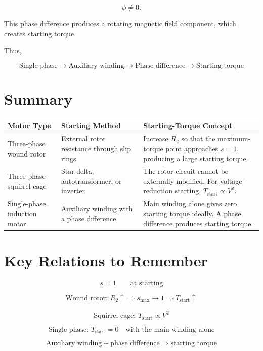 \documentclass[a4paper,11pt]{article}
\begin{document}
\[
\phi \neq 0.
\]

This phase difference produces a rotating magnetic field component,
which creates starting torque.

Thus,

\[
\boxed{
\text{Single phase}
\rightarrow
\text{Auxiliary winding}
\rightarrow
\text{Phase difference}
\rightarrow
\text{Starting torque}
}
\]

\section{Summary}

\begin{center}
\renewcommand{\arraystretch}{1.5}
\begin{tabular}{p{} p{} p{}}
\toprule
\textbf{Motor Type} &
\textbf{Starting Method} &
\textbf{Starting-Torque Concept} \\
\midrule

Three-phase wound rotor &
External rotor resistance through slip rings &
Increase \(R_2\) so that the maximum-torque point approaches
\(s=1\), producing a large starting torque. \\

Three-phase squirrel cage &
Star-delta, autotransformer, or inverter &
The rotor circuit cannot be externally modified.
For voltage-reduction starting,
\(T_{\mathrm{start}}\propto V^2\). \\

Single-phase induction motor &
Auxiliary winding with a phase difference &
Main winding alone gives zero starting torque ideally.
A phase difference produces starting torque. \\

\bottomrule
\end{tabular}
\end{center}

\section{Key Relations to Remember}

\[
\boxed{s=1 \qquad \text{at starting}}
\]

\[
\boxed{
\text{Wound rotor: }
R_2\uparrow
\Rightarrow
s_{\mathrm{max}}\rightarrow 1
\Rightarrow
T_{\mathrm{start}}\uparrow
}
\]

\[
\boxed{
\text{Squirrel cage: }
T_{\mathrm{start}}\propto V^2
}
\]

\[
\boxed{
\text{Single phase: }
T_{\mathrm{start}}=0
\quad
\text{with the main winding alone}
}
\]

\[
\boxed{
\text{Auxiliary winding}
+
\text{phase difference}
\Rightarrow
\text{starting torque}
}
\]
\end{document}
